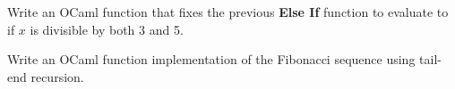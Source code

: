 \vspace{1em}
\begin{Exercise}
Write an OCaml function that fixes the previous \textbf{Else If} function to evaluate to  if $x$ is divisible by both 3 and 5.
\end{Exercise}

\vspace{1em}
\begin{Exercise}
Write an OCaml function implementation of the Fibonacci sequence using tail-end recursion.
\end{Exercise}





